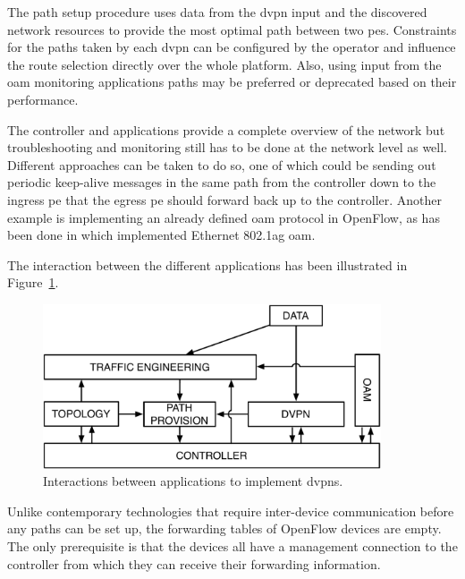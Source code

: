 \begin{description}[leftmargin=!,labelwidth=\widthof{\bfseries Topology Discovery}]
	\item[Traffic Engineering] The path setup procedure uses data from the \ac{dvpn} input and the discovered network resources to provide the most optimal path between two \acp{pe}. Constraints for the paths taken by each \ac{dvpn} can be configured by the operator and influence the route selection directly over the whole platform. Also, using input from the \ac{oam} monitoring applications paths may be preferred or deprecated based on their performance.
	
	\item[\acs{oam}] The controller and applications provide a complete overview of the network but troubleshooting and monitoring still has to be done at the network level as well. Different approaches can be taken to do so, one of which could be sending out periodic keep-alive messages in the same path from the controller down to the ingress \ac{pe} that the egress \ac{pe} should forward back up to the controller. Another example is implementing an already defined \ac{oam} protocol in OpenFlow, as has been done in \cite{of-oam} which implemented Ethernet 802.1ag \ac{oam}.
\end{description}

The interaction between the different applications has been illustrated in Figure~\ref{fig:dvpn-apps}.

\begin{figure}[h]
	\centering
	\includegraphics[width=10cm]{./includes/dvpn-apps.pdf}
	\caption{Interactions between applications to implement \acp{dvpn}.}
	\label{fig:dvpn-apps}
\end{figure}

Unlike contemporary technologies that require inter-device communication before any paths can be set up, the forwarding tables of OpenFlow devices are empty. The only prerequisite is that the devices all have a management connection to the controller from which they can receive their forwarding information.




